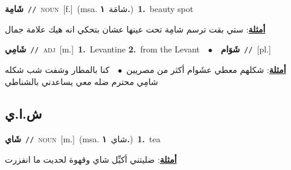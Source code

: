 \documentclass[10pt,a4paper,twoside]{article} %
\begin{document}
\begin{multicols}{2}
{{{{{\setlength\topsep{0pt}\textbf{\foreignlanguage{arabic}{شَامِة}}\ {\color{gray}\texttt{//}\color{black}}\ \textsc{noun}\ [f.]\ \color{gray}(msa. \foreignlanguage{arabic}{شامَة}~\foreignlanguage{arabic}{\textbf{١.}})\color{black}\ \textbf{1.}~beauty spot\  \begin{flushright}\color{gray}\foreignlanguage{arabic}{\textbf{\underline{\foreignlanguage{arabic}{أمثلة}}}: ستي بقت ترسم شامِة تحت عينها عشان بتحكي انه هيك علامة جمال}\end{flushright}\color{black}} \vspace{2mm}

{\setlength\topsep{0pt}\textbf{\foreignlanguage{arabic}{شَامِي}}\ {\color{gray}\texttt{//}\color{black}}\ \textsc{adj}\ [m.]\ \textbf{1.}~Levantine  \textbf{2.}~from the Levant\ \ $\bullet$\ \ \setlength\topsep{0pt}\textbf{\foreignlanguage{arabic}{شَوَام}}\ {\color{gray}\texttt{//}\color{black}}\ [pl.]\  \begin{flushright}\color{gray}\foreignlanguage{arabic}{\textbf{\underline{\foreignlanguage{arabic}{أمثلة}}}: شكلهم معطي عشَوام أكثر من مصريين\ $\bullet$\ \  كنا بالمطار وشفت شب شكله شامِي محترم ضله معي يساعدني بالشناطي}\end{flushright}\color{black}} \vspace{2mm}

\vspace{-3mm}
\subsection*{\color{blue}\foreignlanguage{arabic}{ش.ا.ي}\color{blue}{ (ntws)}} 

{\setlength\topsep{0pt}\textbf{\foreignlanguage{arabic}{شَاي}}\ {\color{gray}\texttt{//}\color{black}}\ \textsc{noun}\ [m.]\ \color{gray}(msa. \foreignlanguage{arabic}{شاي}~\foreignlanguage{arabic}{\textbf{١.}})\color{black}\ \textbf{1.}~tea\  \begin{flushright}\color{gray}\foreignlanguage{arabic}{\textbf{\underline{\foreignlanguage{arabic}{أمثلة}}}: ضليتني أكيِّل شاي وقهوة لحديت ما انفزرت}\end{flushright}\color{black}} \vspace{2mm}

}}}}
\end{multicols}
\end{document}
